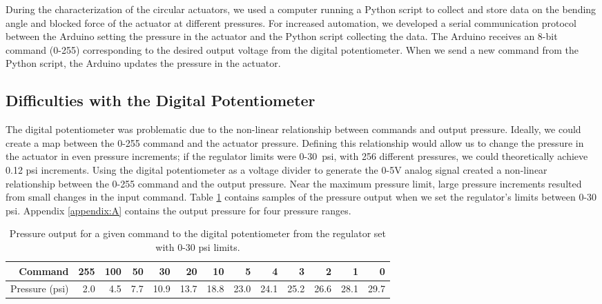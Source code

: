 During the characterization of the circular actuators, we used a computer running a Python script to collect and store data on the bending angle and blocked force of the actuator at different pressures. For increased automation, we developed a serial communication protocol between the Arduino setting the pressure in the actuator and the Python script collecting the data. The Arduino receives an 8-bit command (0-255) corresponding to the desired output voltage from the digital potentiometer. When we send a new command from the Python script, the Arduino updates the pressure in the actuator. 

\subsection{Difficulties with the Digital Potentiometer}

The digital potentiometer was problematic due to the non-linear relationship between commands and output pressure. Ideally, we could create a map between the 0-255 command and the actuator pressure. Defining this relationship would allow us to change the pressure in the actuator in even pressure increments; if the regulator limits were 0-30~psi, with 256 different pressures, we could theoretically achieve 0.12 psi increments. Using the digital potentiometer as a voltage divider to generate the 0-5V analog signal created a non-linear relationship between the 0-255 command and the output pressure. Near the maximum pressure limit, large pressure increments resulted from small changes in the input command. Table \ref{table:bitmap} contains samples of the pressure output when we set the regulator's limits between 0-30 psi. Appendix \ref{appendix:A} contains the output pressure for four pressure ranges. \\

\begin{table}[ht]
    \centering
    \begin{tabular}{|r|r|r|r|r|r|r|r|r|r|r|r|r|}
        \hline
        Command  & 255 & 100 & 50  & 30   & 20   & 10   & 5    & 4    & 3    & 2    & 1    & 0    \\ \hline
        Pressure (psi) & 2.0 & 4.5 & 7.7 & 10.9 & 13.7 & 18.8 & 23.0 & 24.1 & 25.2 & 26.6 & 28.1 & 29.7 \\ \hline
    \end{tabular}
    \caption{Pressure output for a given command to the digital potentiometer from the regulator set with 0-30 psi limits.}
    \label{table:bitmap}
\end{table}

